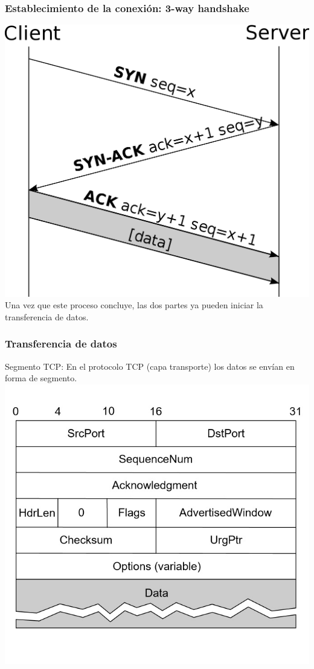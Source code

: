 \documentclass{beamer}
\begin{document}
\begin{frame}
\frametitle{Establecimiento de la conexión: 3-way handshake}
\includegraphics[scale=0.2]{3}\\
\vspace{5mm}
Una vez que este proceso concluye, las dos partes ya pueden iniciar la transferencia de datos.
\end{frame}

\begin{frame}
\frametitle{Transferencia de datos}
Segmento TCP: En el protocolo TCP (capa transporte) los datos se envían en forma de segmento.\\
\includegraphics[scale=0.5]{segmento}\\
\end{frame}
\end{document}
